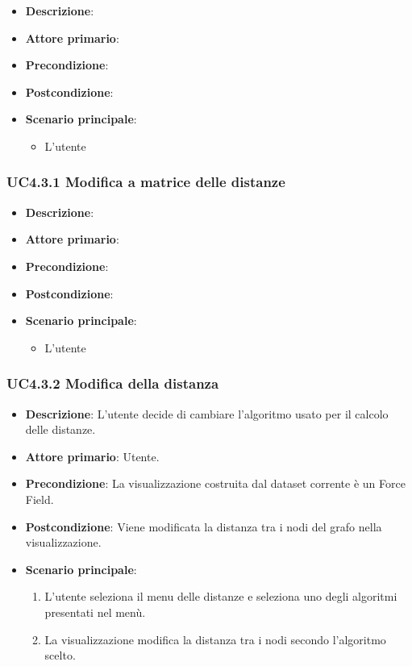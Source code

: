 \begin{itemize}
    \item \textbf{Descrizione}:     
    \item \textbf{Attore primario}:
    \item \textbf{Precondizione}:
    \item \textbf{Postcondizione}:
    \item \textbf{Scenario principale}:
    \begin{itemize}
        \item L'utente
    \end{itemize}
\end{itemize}

\subsubsection{UC4.3.1 Modifica a matrice delle distanze}
\label{ssub:uc4.3.1}
\begin{itemize}
    \item \textbf{Descrizione}:
    \item \textbf{Attore primario}:
    \item \textbf{Precondizione}:
    \item \textbf{Postcondizione}:
    \item \textbf{Scenario principale}:
    \begin{itemize}
        \item L'utente
    \end{itemize}
\end{itemize}

\subsubsection{UC4.3.2 Modifica della distanza}
\label{subsec:uc4.3.2}
\begin{itemize}
    \item \textbf{Descrizione}: L’utente decide di cambiare l’algoritmo usato per il calcolo delle distanze.

	
    \item \textbf{Attore primario}: Utente.
    
    \item \textbf{Precondizione}:   La visualizzazione costruita dal dataset corrente è un Force Field.
    \item \textbf{Postcondizione}:  Viene modificata la distanza tra i nodi del grafo nella visualizzazione.

	\item \textbf{Scenario principale}:
        \begin{enumerate}
            \item L'utente seleziona il menu delle distanze e seleziona uno degli algoritmi presentati nel menù.
            \item La visualizzazione modifica la distanza tra i nodi secondo l'algoritmo scelto.
        \end{enumerate}
\end{itemize}

